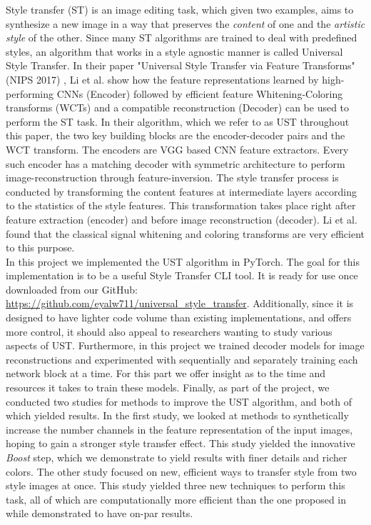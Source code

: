 \hspace{0.5cm} Style transfer (ST) is an image editing task, which given two examples, aims to synthesize a new image in a way that preserves the \textit{content} of one and the \textit{artistic style} of the other. Since many ST algorithms are trained to deal with predefined styles, an algorithm that works in a style agnostic manner is called Universal Style Transfer.
In their paper "Universal Style Transfer via Feature Transforms" (NIPS 2017) \cite{bib11}, Li et al. show how the feature representations learned by high-performing CNNs (Encoder) followed by efficient feature Whitening-Coloring transforms (WCTs) and a compatible reconstruction (Decoder) can be used to perform the ST task. In their algorithm, which we refer to as UST throughout this paper, the two key building blocks are the encoder-decoder pairs and the WCT transform. The encoders are VGG based CNN feature extractors. Every such encoder has a matching decoder with symmetric architecture to perform image-reconstruction through feature-inversion. The style transfer process is conducted by transforming the content features at intermediate layers according to the statistics of the style features. This transformation takes place right after feature extraction (encoder) and before image reconstruction (decoder). Li et al. found that the classical signal whitening and coloring transforms are very efficient to this purpose.\\
In this project we implemented the UST algorithm in PyTorch. The goal for this implementation is to be a useful Style Transfer CLI tool. It is ready for use once downloaded from our GitHub: \url{https://github.com/eyalw711/universal_style_transfer}. Additionally, since it is designed to have lighter code volume than existing implementations, and offers more control, it should also appeal to researchers wanting to study various aspects of UST. Furthermore, in this project we trained decoder models for image reconstructions and experimented with sequentially and separately training each network block at a time. For this part we offer insight as to the time and resources it takes to train these models. Finally, as part of the project, we conducted two studies for methods to improve the UST algorithm, and both of which yielded results. In the first study, we looked at methods to synthetically increase the number channels in the feature representation of the input images, hoping to gain a stronger style transfer effect. This study yielded the innovative \textit{Boost} step, which we demonstrate to yield results with finer details and richer colors. The other study focused on new, efficient ways to transfer style from two style images at once. This study yielded three new techniques to perform this task, all of which are computationally more efficient than the one proposed in \cite{bib11} while demonstrated to have on-par results. \\

